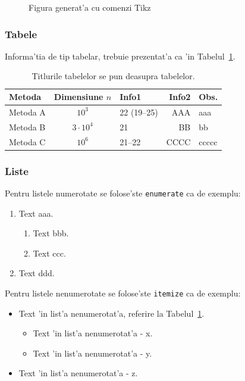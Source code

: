 \begin{figure}[ht]  %
\centering
 
\caption{Figura generat'a cu comenzi Tikz}
\label{fig:tikz}
\end{figure}

\subsubsection{Tabele}

Informa'tia de tip tabelar, trebuie prezentat'a ca 'in
Tabelul~\ref{tab:exemplu_tabel}.

\begin{table}[ht]  %
\centering
\caption{Titlurile tabelelor se pun deasupra tabelelor.}
\label{tab:exemplu_tabel}       %
%
%
\begin{tabular}{|p{2cm}||c|l|r|p{3cm}|}  \hline  %
Metoda & Dimensiune $n$ & Info1 & Info2 &Obs.  \\ \hline \hline
Metoda A & $10^3$  & 22 (19--25) & AAA& aaa\\
Metoda B & $3 \cdot 10^{4}$ & 21 & BB & bb\\
Metoda C & $10^6$  & 21--22 & CCCC& ccccc\\  \hline
\end{tabular}
\end{table}

\subsubsection{Liste}

Pentru listele numerotate se folose'ste \verb|enumerate|
ca de exemplu:
\begin{enumerate}
\item{Text aaa.}
\begin{enumerate}
\item{Text bbb.}
\item{Text ccc.}
\end{enumerate}
\item{Text ddd.}
\end{enumerate}

Pentru listele nenumerotate se folose'ste \verb|itemize| ca de exemplu:
\begin{itemize}
\item{Text 'in list'a nenumerotat'a, referire la Tabelul~\ref{tab:exemplu_tabel}.}
\begin{itemize}
\item{Text 'in list'a nenumerotat'a - x.}
\item{Text 'in list'a nenumerotat'a - y.}
\end{itemize}
\item{Text 'in list'a nenumerotat'a - z.}
\end{itemize}

